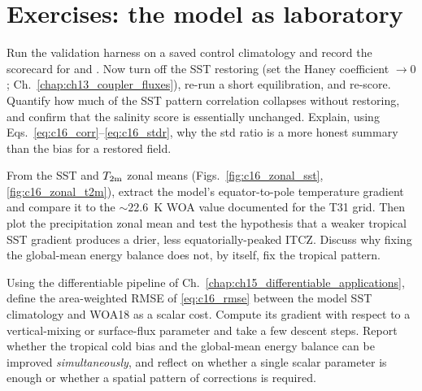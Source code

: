 \section*{Exercises: the model as laboratory}

\begin{exercise}
Run the validation harness on a saved control climatology and record the
scorecard for  and . Now turn off the SST restoring (set the
Haney coefficient $\to0$; Ch.~\ref{chap:ch13_coupler_fluxes}), re-run a
short equilibration, and re-score. Quantify how much of the SST pattern
correlation collapses without restoring, and confirm that the salinity score is
essentially unchanged. Explain, using Eqs.~\eqref{eq:c16_corr}--\eqref{eq:c16_stdr},
why the std ratio is a more honest summary than the bias for a restored field.
\end{exercise}

\begin{exercise}
From the SST and $T_{2\mathrm{m}}$ zonal means (Figs.~\ref{fig:c16_zonal_sst},
\ref{fig:c16_zonal_t2m}), extract the model's equator-to-pole temperature
gradient and compare it to the $\sim\!22.6$~K WOA value documented for the T31
grid. Then plot the precipitation zonal mean and test the hypothesis that a
weaker tropical SST gradient produces a drier, less equatorially-peaked ITCZ.
Discuss why fixing the global-mean energy balance does not, by itself, fix the
tropical pattern.
\end{exercise}

\begin{exercise}
Using the differentiable pipeline of Ch.~\ref{chap:ch15_differentiable_applications},
define the area-weighted RMSE of \eqref{eq:c16_rmse} between the model SST
climatology and WOA18 as a scalar cost. Compute its gradient with respect to a
vertical-mixing or surface-flux parameter and take a few descent steps. Report
whether the tropical cold bias and the global-mean energy balance can be improved
\emph{simultaneously}, and reflect on whether a single scalar parameter is enough
or whether a spatial pattern of corrections is required.
\end{exercise}

